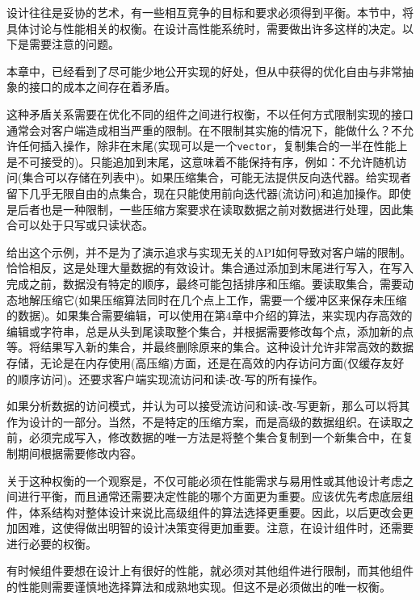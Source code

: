 
设计往往是妥协的艺术，有一些相互竞争的目标和要求必须得到平衡。本节中，将具体讨论与性能相关的权衡。在设计高性能系统时，需要做出许多这样的决定。以下是需要注意的问题。


本章中，已经看到了尽可能少地公开实现的好处，但从中获得的优化自由与非常抽象的接口的成本之间存在着矛盾。 

这种矛盾关系需要在优化不同的组件之间进行权衡，不以任何方式限制实现的接口通常会对客户端造成相当严重的限制。在不限制其实施的情况下，能做什么？不允许任何插入操作，除非在末尾(实现可以是一个\texttt{vector}，复制集合的一半在性能上是不可接受的)。只能追加到末尾，这意味着不能保持有序，例如：不允许随机访问(集合可以存储在列表中)。如果压缩集合，可能无法提供反向迭代器。给实现者留下几乎无限自由的点集合，现在只能使用前向迭代器(流访问)和追加操作。即使是后者也是一种限制，一些压缩方案要求在读取数据之前对数据进行处理，因此集合可以处于只写或只读状态。

给出这个示例，并不是为了演示追求与实现无关的API如何导致对客户端的限制。恰恰相反，这是处理大量数据的有效设计。集合通过添加到末尾进行写入，在写入完成之前，数据没有特定的顺序，最终可能包括排序和压缩。要读取集合，需要动态地解压缩它(如果压缩算法同时在几个点上工作，需要一个缓冲区来保存未压缩的数据)。如果集合需要编辑，可以使用在第4章中介绍的算法，来实现内存高效的编辑或字符串，总是从头到尾读取整个集合，并根据需要修改每个点，添加新的点等。将结果写入新的集合，并最终删除原来的集合。这种设计允许非常高效的数据存储，无论是在内存使用(高压缩)方面，还是在高效的内存访问方面(仅缓存友好的顺序访问)。还要求客户端实现流访问和读-改-写的所有操作。 

如果分析数据的访问模式，并认为可以接受流访问和读-改-写更新，那么可以将其作为设计的一部分。当然，不是特定的压缩方案，而是高级的数据组织。在读取之前，必须完成写入，修改数据的唯一方法是将整个集合复制到一个新集合中，在复制期间根据需要修改内容。 

关于这种权衡的一个观察是，不仅可能必须在性能需求与易用性或其他设计考虑之间进行平衡，而且通常还需要决定性能的哪个方面更为重要。应该优先考虑底层组件，体系结构对整体设计来说比高级组件的算法选择更重要。因此，以后更改会更加困难，这使得做出明智的设计决策变得更加重要。注意，在设计组件时，还需要进行必要的权衡。 


有时候组件要想在设计上有很好的性能，就必须对其他组件进行限制，而其他组件的性能则需要谨慎地选择算法和成熟地实现。但这不是必须做出的唯一权衡。 

